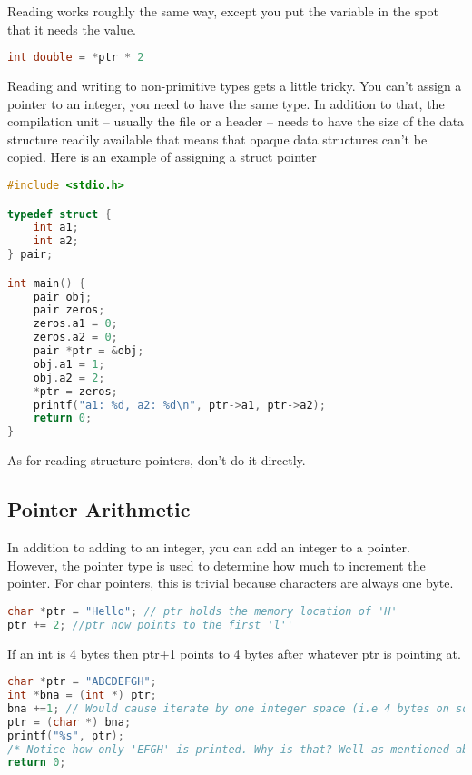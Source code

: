 Reading works roughly the same way, except you put the variable in the spot that it needs the value.

\begin{lstlisting}[language=C]
  int double = *ptr * 2
\end{lstlisting}

Reading and writing to non-primitive types gets a little tricky.
You can't assign a pointer to an integer, you need to have the same type.
In addition to that, the compilation unit -- usually the file or a header -- needs to have the size of the data structure readily available that means that opaque data structures can't be copied.
Here is an example of assigning a struct pointer

\begin{lstlisting}[language=C]
#include <stdio.h>

typedef struct {
    int a1;
    int a2;
} pair;

int main() {
    pair obj;
    pair zeros;
    zeros.a1 = 0;
    zeros.a2 = 0;
    pair *ptr = &obj;
    obj.a1 = 1;
    obj.a2 = 2;
    *ptr = zeros;
    printf("a1: %d, a2: %d\n", ptr->a1, ptr->a2);
    return 0;
}
\end{lstlisting}

As for reading structure pointers, don't do it directly.

\subsection{Pointer Arithmetic}

In addition to adding to an integer, you can add an integer to a pointer.
However, the pointer type is used to determine how much to increment the pointer.
For char pointers, this is trivial because characters are always one byte.

\begin{lstlisting}[language=C]
char *ptr = "Hello"; // ptr holds the memory location of 'H'
ptr += 2; //ptr now points to the first 'l''
\end{lstlisting}

If an int is 4 bytes then ptr+1 points to 4 bytes after whatever ptr is pointing at.

\begin{lstlisting}[language=C]
char *ptr = "ABCDEFGH";
int *bna = (int *) ptr;
bna +=1; // Would cause iterate by one integer space (i.e 4 bytes on some systems)
ptr = (char *) bna;
printf("%s", ptr);
/* Notice how only 'EFGH' is printed. Why is that? Well as mentioned above, when performing 'bna+=1' we are increasing the **integer** pointer by 1, (translates to 4 bytes on most systems) which is equivalent to 4 characters (each character is only 1 byte)*/
return 0;
\end{lstlisting}

